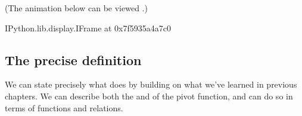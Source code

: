 \documentclass[letterpaper,10pt,english]{jupyterBook}
\begin{document}
\sphinxAtStartPar
(The animation below can be viewed .)

\begin{sphinxVerbatim}[commandchars=\\\{\}]
\PYGZlt{}IPython.lib.display.IFrame at 0x7f5935a4a7c0\PYGZgt{}
\end{sphinxVerbatim}


\subsection{The precise definition}
\label{\detokenize{chapter-6-single-table-verbs:the-precise-definition}}
\sphinxAtStartPar
We can state precisely what  does by building on what we’ve learned in previous chapters.  We can describe both the  and  of the pivot function, and can do so in terms of functions and relations.
\end{document}
